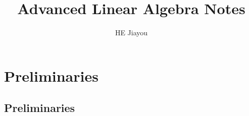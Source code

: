 \documentclass[]{report}
\title{Advanced Linear Algebra Notes}
\author{HE Jiayou}
\begin{document}
\maketitle
\tableofcontents

\chapter{Preliminaries}

\section{Preliminaries}


\end{document}

